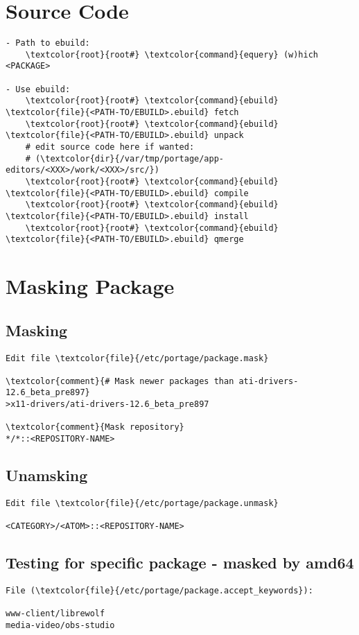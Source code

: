 \documentclass[10pt, a4paper, onecolumn, openany]{book}         %
\begin{document}
\section{Source Code}
\begin{Verbatim}[commandchars=\\\{\}]
- Path to ebuild:
    \textcolor{root}{root#} \textcolor{command}{equery} (w)hich <PACKAGE>
    
- Use ebuild:
    \textcolor{root}{root#} \textcolor{command}{ebuild} \textcolor{file}{<PATH-TO/EBUILD>.ebuild} fetch
    \textcolor{root}{root#} \textcolor{command}{ebuild} \textcolor{file}{<PATH-TO/EBUILD>.ebuild} unpack
    # edit source code here if wanted:
    # (\textcolor{dir}{/var/tmp/portage/app-editors/<XXX>/work/<XXX>/src/})
    \textcolor{root}{root#} \textcolor{command}{ebuild} \textcolor{file}{<PATH-TO/EBUILD>.ebuild} compile
    \textcolor{root}{root#} \textcolor{command}{ebuild} \textcolor{file}{<PATH-TO/EBUILD>.ebuild} install
    \textcolor{root}{root#} \textcolor{command}{ebuild} \textcolor{file}{<PATH-TO/EBUILD>.ebuild} qmerge
\end{Verbatim}

\section{Masking Package}
\subsection{Masking}
\begin{Verbatim}[commandchars=\\\{\}]
Edit file \textcolor{file}{/etc/portage/package.mask}

\textcolor{comment}{# Mask newer packages than ati-drivers-12.6_beta_pre897}
>x11-drivers/ati-drivers-12.6_beta_pre897

\textcolor{comment}{Mask repository}
*/*::<REPOSITORY-NAME>
\end{Verbatim}
\subsection{Unamsking}
\begin{Verbatim}[commandchars=\\\{\}]
Edit file \textcolor{file}{/etc/portage/package.unmask}

<CATEGORY>/<ATOM>::<REPOSITORY-NAME>
\end{Verbatim}

\subsection{Testing for specific package - masked by amd64}
\begin{Verbatim}[commandchars=\\\{\}]
File (\textcolor{file}{/etc/portage/package.accept_keywords}):

www-client/librewolf
media-video/obs-studio
\end{Verbatim}
\end{document}
